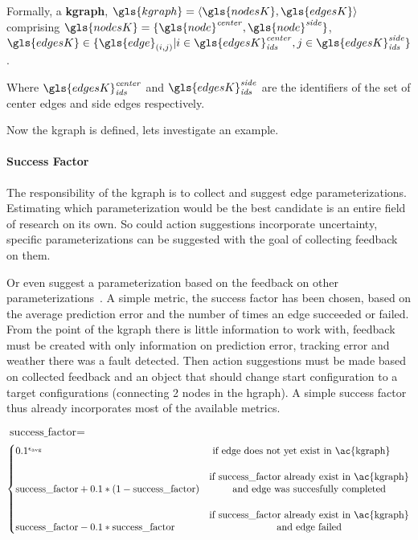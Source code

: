 Formally, a \textbf{\acl{kgraph}}, $\gls{kgraph} = \left\langle \gls{nodesK}, \gls{edgesK} \right\rangle $
\\comprising $\gls{nodesK} = \{\gls{node}^{\mathit{center}}, \gls{node}^{\mathit{side}}\}$, \quad $\gls{edgesK} \in \{\gls{edge}_{(i,j)}| i \in \gls{edgesK}^\mathit{center}_\mathit{ids}, j \in \gls{edgesK}^\mathit{side}_\mathit{ids} \}$.\bs

Where $\gls{edgesK}^\mathit{center}_\mathit{ids}$ and $\gls{edgesK}^\mathit{side}_\mathit{ids}$ are the identifiers of the set of center edges and side edges respectively.\bs 

Now the \ac{kgraph} is defined, lets investigate an example.\bs

\paragraph{Success Factor} The responsibility of the \ac{kgraph} is to collect and suggest edge parameterizations. Estimating which parameterization would be the best candidate is an entire field of research on its own. So could action suggestions incorporate uncertainty, specific  parameterizations can be suggested with the goal of collecting feedback on them. 

Or even suggest a parameterization based on the feedback on other parameterizations~\cite{kopicki_learning_2017}. A simple metric, the success factor has been chosen, based on the average prediction error and the number of times an edge succeeded or failed. From the point of the \ac{kgraph} there is little information to work with, feedback must be created with only information on prediction error, tracking error and weather there was a fault detected. Then action suggestions must be made based on collected feedback and an object that should change start configuration to a target configurations (connecting 2 nodes in the \ac{hgraph}). A simple success factor thus already incorporates most of the available metrics.\bs


$\textrm{success\_factor} = $
\[
  \begin{cases} 0.1^{\epsilon_{\textrm {avg}}}& \textrm { if edge does not yet exist in \ac{kgraph}}\\ 
    &\\
  \textrm{success\_factor} + 0.1*(1-\textrm{success\_factor}) & \textrm{\shortstack{if success\_factor already exist in \ac{kgraph}\\ and edge was succesfully completed}}\\
    &\\
  \textrm{success\_factor} - 0.1*\textrm{success\_factor} & \textrm{\shortstack{if success\_factor already exist in \ac{kgraph}\\ and edge failed}}
\end{cases}
\]

